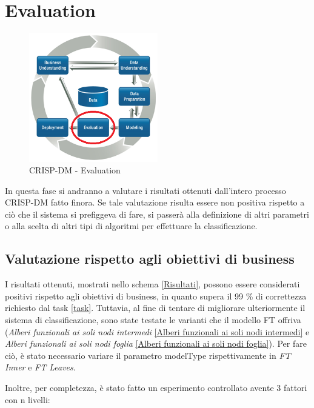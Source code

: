 \chapter{Evaluation}

\begin{figure}[hbtp]
	\centering
	\includegraphics[width=0.5\textwidth]{./images/CRISPDM_5.png}
	\caption{CRISP-DM - Evaluation}
	\label{CRISPDM_5}
\end{figure}
In questa fase si andranno a valutare i risultati ottenuti dall'intero processo CRISP-DM fatto finora. Se tale valutazione risulta essere non positiva rispetto a ciò che il sistema si prefiggeva di fare, si passerà alla definizione di altri parametri o alla scelta di altri tipi di algoritmi per effettuare la classificazione.

\section{Valutazione rispetto agli obiettivi di business}
I risultati ottenuti, mostrati nello schema \ref{Risultati}, possono essere considerati positivi rispetto agli obiettivi di business, in quanto supera il 99 \% di correttezza richiesto dal task \ref{task}. 
Tuttavia, al fine di tentare di migliorare ulteriormente il sistema di classificazione, sono state testate le varianti che il modello FT offriva (\emph{Alberi funzionali ai soli nodi intermedi} \ref{Alberi funzionali ai soli nodi intermedi} e \emph{Alberi funzionali ai soli nodi foglia} \ref{Alberi funzionali ai soli nodi foglia}). Per fare ciò, è stato necessario variare il parametro modelType rispettivamente in \emph{FT Inner} e \emph{FT Leaves}.

Inoltre, per completezza, è stato fatto un esperimento controllato avente 3 fattori con n livelli:

